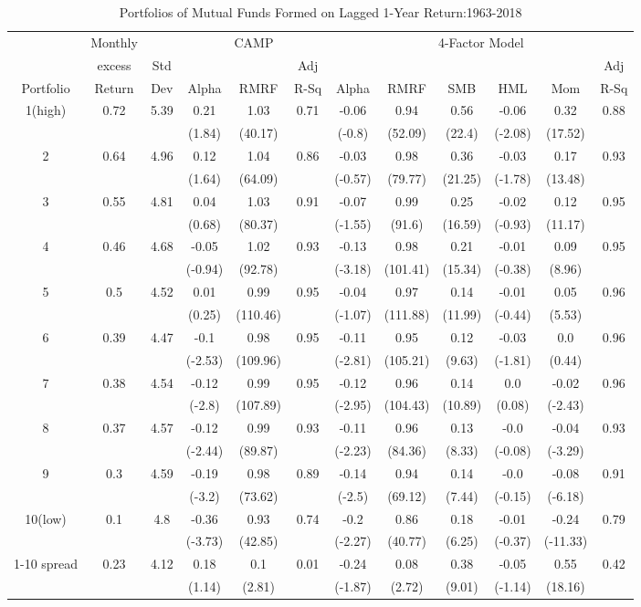 \documentclass[a4paper]{article}
\begin{document}
    \begin{table}[h!]
        \centering
        \begin{tabular}{c cc ccc cccccc} 
        \toprule[1.5pt]
          &  Monthly &  & \multicolumn{3}{c}{CAMP} &  \multicolumn{6}{c}{4-Factor Model}\\
          & excess& Std &   &  & Adj &   &  &  &  &  & Adj\\
         Portfolio & Return & Dev & Alpha  & RMRF & R-Sq &  Alpha  & RMRF & SMB & HML & Mom &  R-Sq\\
        
        \toprule[1.5pt]
        1(high)&0.72&5.39&0.21&1.03&0.71&-0.06&0.94&0.56&-0.06&0.32&0.88\\
        &&&(1.84)&(40.17)&&(-0.8)&(52.09)&(22.4)&(-2.08)&(17.52)&\\
        2&0.64&4.96&0.12&1.04&0.86&-0.03&0.98&0.36&-0.03&0.17&0.93\\
        &&&(1.64)&(64.09)&&(-0.57)&(79.77)&(21.25)&(-1.78)&(13.48)&\\
        3&0.55&4.81&0.04&1.03&0.91&-0.07&0.99&0.25&-0.02&0.12&0.95\\
        &&&(0.68)&(80.37)&&(-1.55)&(91.6)&(16.59)&(-0.93)&(11.17)&\\
        4&0.46&4.68&-0.05&1.02&0.93&-0.13&0.98&0.21&-0.01&0.09&0.95\\
        &&&(-0.94)&(92.78)&&(-3.18)&(101.41)&(15.34)&(-0.38)&(8.96)&\\
        5&0.5&4.52&0.01&0.99&0.95&-0.04&0.97&0.14&-0.01&0.05&0.96\\
        &&&(0.25)&(110.46)&&(-1.07)&(111.88)&(11.99)&(-0.44)&(5.53)&\\
        6&0.39&4.47&-0.1&0.98&0.95&-0.11&0.95&0.12&-0.03&0.0&0.96\\
        &&&(-2.53)&(109.96)&&(-2.81)&(105.21)&(9.63)&(-1.81)&(0.44)&\\
        7&0.38&4.54&-0.12&0.99&0.95&-0.12&0.96&0.14&0.0&-0.02&0.96\\
        &&&(-2.8)&(107.89)&&(-2.95)&(104.43)&(10.89)&(0.08)&(-2.43)&\\
        8&0.37&4.57&-0.12&0.99&0.93&-0.11&0.96&0.13&-0.0&-0.04&0.93\\
        &&&(-2.44)&(89.87)&&(-2.23)&(84.36)&(8.33)&(-0.08)&(-3.29)&\\
        9&0.3&4.59&-0.19&0.98&0.89&-0.14&0.94&0.14&-0.0&-0.08&0.91\\
        &&&(-3.2)&(73.62)&&(-2.5)&(69.12)&(7.44)&(-0.15)&(-6.18)&\\
        10(low)&0.1&4.8&-0.36&0.93&0.74&-0.2&0.86&0.18&-0.01&-0.24&0.79\\
        &&&(-3.73)&(42.85)&&(-2.27)&(40.77)&(6.25)&(-0.37)&(-11.33)&\\
        1-10 spread&0.23&4.12&0.18&0.1&0.01&-0.24&0.08&0.38&-0.05&0.55&0.42\\
        &&&(1.14)&(2.81)&&(-1.87)&(2.72)&(9.01)&(-1.14)&(18.16)&\\
        
        \toprule[1.5pt]
        \end{tabular}
        \caption{Portfolios of Mutual Funds Formed on Lagged 1-Year Return:1963-2018}
        \label{table:1}
        \end{table}
\end{document}
